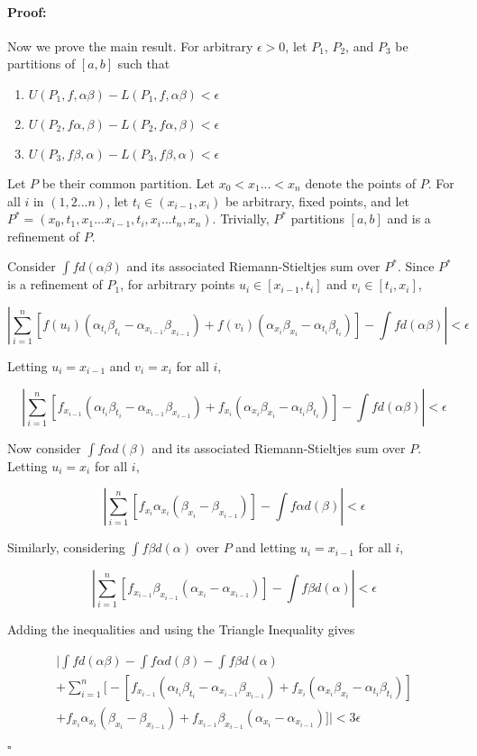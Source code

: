 \documentclass{article}
\newenvironment{proof}{\paragraph{Proof:}}{\hfill$\square$}
\begin{document}
\begin{proof}
Now we prove the main result. For arbitrary $\epsilon > 0$, let $P_1$, $P_2$, and $P_3$ be partitions of $[a, b]$ such that

\begin{enumerate}
\item $U(P_1, f, \alpha\beta) - L(P_1, f, \alpha\beta) < \epsilon$
\item $U(P_2, f\alpha, \beta) - L(P_2, f\alpha, \beta) < \epsilon$
\item $U(P_3, f\beta, \alpha) - L(P_3, f\beta, \alpha) < \epsilon$
\end{enumerate}

Let $P$ be their common partition. Let $x_0 < x_1 ... < x_n$ denote the points of $P$. For all $i$ in $(1, 2...n)$, let $t_i \in (x_{i-1}, x_i)$ be arbitrary, fixed points, and let $P^* = (x_0, t_1, x_1 ... x_{i-1}, t_i, x_i ... t_n, x_n)$. Trivially, $P^*$ partitions $[a, b]$ and is a refinement of $P$.

Consider $\int f d(\alpha\beta)$ and its associated Riemann-Stieltjes sum over $P^*$. Since $P^*$ is a refinement of $P_1$, for arbitrary points $u_i \in [x_{i-1}, t_i]$ and $v_i \in [t_i, x_i]$,

\[
|\sum_{i=1}^n \left[f(u_i)(\alpha_{t_i}\beta_{t_i} - \alpha_{x_{i-1}}\beta_{x_{i-1}})
+ f(v_i)(\alpha_{x_i}\beta_{x_i} - \alpha_{t_i}\beta_{t_i})\right]
- \int f d(\alpha\beta)|
< \epsilon
\]

Letting $u_i = x_{i-1}$ and $v_i = x_i$ for all $i$,

\[
|\sum_{i=1}^n \left[f_{x_{i-1}}(\alpha_{t_i}\beta_{t_i} - \alpha_{x_{i-1}}\beta_{x_{i-1}})
+ f_{x_i}(\alpha_{x_i}\beta_{x_i} - \alpha_{t_i}\beta_{t_i})\right]
- \int f d(\alpha\beta)|
< \epsilon
\]

Now consider $\int f\alpha d(\beta)$ and its associated Riemann-Stieltjes sum over $P$. Letting $u_i = x_i$ for all $i$,

\[
|\sum_{i=1}^n \left[f_{x_i}\alpha_{x_i}(\beta_{x_i} - \beta_{x_{i-1}})\right]
- \int f\alpha d(\beta)|
< \epsilon
\]

Similarly, considering $\int f\beta d(\alpha)$ over $P$ and letting $u_i = x_{i-1}$ for all $i$,

\[
|\sum_{i=1}^n \left[f_{x_{i-1}}\beta_{x_{i-1}}(\alpha_{x_i} - \alpha_{x_{i-1}})\right]
- \int f\beta d(\alpha)|
< \epsilon
\]

Adding the inequalities and using the Triangle Inequality gives

\begin{gather*}
\bigg|
\int f d(\alpha\beta) - \int f\alpha d(\beta) - \int f\beta d(\alpha) \\
+ \sum_{i=1}^n \Big[
-\left[f_{x_{i-1}}(\alpha_{t_i}\beta_{t_i} - \alpha_{x_{i-1}}\beta_{x_{i-1}})
+ f_{x_i}(\alpha_{x_i}\beta_{x_i} - \alpha_{t_i}\beta_{t_i}) \right] \\
+ f_{x_i}\alpha_{x_i}(\beta_{x_i} - \beta_{x_{i-1}})
+ f_{x_{i-1}}\beta_{x_{i-1}}(\alpha_{x_i} - \alpha_{x_{i-1}})
\Big] \bigg|
< 3\epsilon
\end{gather*}


\end{proof}
\end{document}
